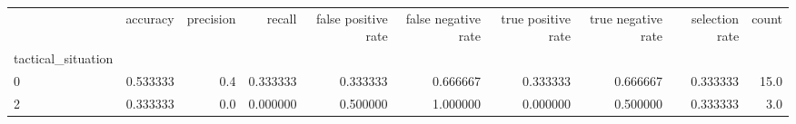 \begin{tabular}{lrrrrrrrrr}
\toprule
{} &  accuracy &  precision &    recall &  false positive rate &  false negative rate &  true positive rate &  true negative rate &  selection rate &  count \\
tactical\_situation &           &            &           &                      &                      &                     &                     &                 &        \\
\midrule
0                  &  0.533333 &        0.4 &  0.333333 &             0.333333 &             0.666667 &            0.333333 &            0.666667 &        0.333333 &   15.0 \\
2                  &  0.333333 &        0.0 &  0.000000 &             0.500000 &             1.000000 &            0.000000 &            0.500000 &        0.333333 &    3.0 \\
\bottomrule
\end{tabular}
